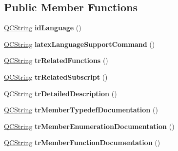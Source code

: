 \subsection*{Public Member Functions}
\begin{DoxyCompactItemize}
\item 
\mbox{\label{class_translator_croatian_a7523d1409b7194459972bcdd86aeec53}} 
\mbox{\hyperlink{class_q_c_string}{Q\+C\+String}} {\bfseries id\+Language} ()
\item 
\mbox{\label{class_translator_croatian_a1cffa3c7123adf9908782aa71d9db01a}} 
\mbox{\hyperlink{class_q_c_string}{Q\+C\+String}} {\bfseries latex\+Language\+Support\+Command} ()
\item 
\mbox{\label{class_translator_croatian_ac41fa972eea583d5272a10427fbda600}} 
\mbox{\hyperlink{class_q_c_string}{Q\+C\+String}} {\bfseries tr\+Related\+Functions} ()
\item 
\mbox{\label{class_translator_croatian_a2b92f76643fa9d0ddab3788451faff54}} 
\mbox{\hyperlink{class_q_c_string}{Q\+C\+String}} {\bfseries tr\+Related\+Subscript} ()
\item 
\mbox{\label{class_translator_croatian_aab786ef813bb0d4ad68f4a27179f459b}} 
\mbox{\hyperlink{class_q_c_string}{Q\+C\+String}} {\bfseries tr\+Detailed\+Description} ()
\item 
\mbox{\label{class_translator_croatian_a4a65b3f3158b1c165147210eeec46727}} 
\mbox{\hyperlink{class_q_c_string}{Q\+C\+String}} {\bfseries tr\+Member\+Typedef\+Documentation} ()
\item 
\mbox{\label{class_translator_croatian_ace83dd0eb8a14d9586b491974b905059}} 
\mbox{\hyperlink{class_q_c_string}{Q\+C\+String}} {\bfseries tr\+Member\+Enumeration\+Documentation} ()
\item 
\mbox{\label{class_translator_croatian_ad8b78086d04741b748a1af06e8ba79eb}} 
\mbox{\hyperlink{class_q_c_string}{Q\+C\+String}} {\bfseries tr\+Member\+Function\+Documentation} ()
\item 

\end{DoxyCompactItemize}
